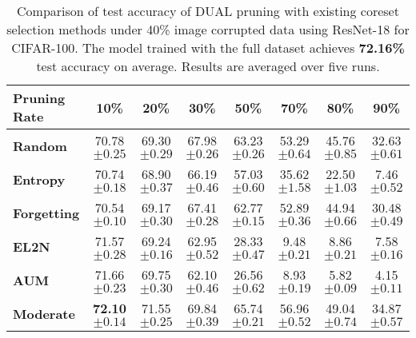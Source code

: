 \begin{table}[ht]
\caption{\label{tab:image_corruption_40_cifar}Comparison of test accuracy of DUAL pruning with existing coreset selection methods under 40\% image corrupted data using ResNet-18 for CIFAR-100. The model trained with the full dataset achieves \textbf{72.16\%} test accuracy on average. Results are averaged over five runs.}
\setlength{\tabcolsep}{3.1pt}
\centering
\begin{tabular}{lccccccc}
    \toprule
    \textbf{Pruning Rate} & \textbf{10\%} & \textbf{20\%} & \textbf{30\%} & \textbf{50\%} & \textbf{70\%} & \textbf{80\%} & \textbf{90\%} \\
    \midrule
    \textbf{Random} & 70.78 \scriptsize{$ \pm 0.25 $} & 69.30 \scriptsize{$ \pm 0.29 $} & 67.98 \scriptsize{$ \pm 0.26 $} & 63.23 \scriptsize{$ \pm 0.26 $} & 53.29 \scriptsize{$ \pm 0.64 $} & 45.76 \scriptsize{$ \pm 0.85 $} & 32.63 \scriptsize{$ \pm 0.61 $} \\
    
    \textbf{Entropy} & 70.74 \scriptsize{$ \pm 0.18 $} & 68.90 \scriptsize{$ \pm 0.37 $} & 66.19 \scriptsize{$ \pm 0.46 $} & 57.03 \scriptsize{$ \pm 0.60 $} & 35.62 \scriptsize{$ \pm 1.58 $} & 22.50 \scriptsize{$ \pm 1.03 $} & 7.46 \scriptsize{$ \pm 0.52 $} \\
    
    \textbf{Forgetting} & 70.54 \scriptsize{$ \pm 0.10 $} & 69.17 \scriptsize{$ \pm 0.30 $} & 67.41 \scriptsize{$ \pm 0.28 $} & 62.77 \scriptsize{$ \pm 0.15 $} & 52.89 \scriptsize{$ \pm 0.36 $} & 44.94 \scriptsize{$ \pm 0.66 $} & 30.48 \scriptsize{$ \pm 0.49 $} \\
    
    \textbf{EL2N} & 71.57 \scriptsize{$ \pm 0.28 $} & 69.24 \scriptsize{$ \pm 0.16 $} & 62.95 \scriptsize{$ \pm 0.52 $} & 28.33 \scriptsize{$ \pm 0.47 $} & 9.48 \scriptsize{$ \pm 0.21 $} & 8.86 \scriptsize{$ \pm 0.21 $} & 7.58 \scriptsize{$ \pm 0.16 $} \\
    
    \textbf{AUM} & 71.66 \scriptsize{$ \pm 0.23 $} & 69.75 \scriptsize{$ \pm 0.30 $} & 62.10 \scriptsize{$ \pm 0.46 $} & 26.56 \scriptsize{$ \pm 0.62 $} & 8.93 \scriptsize{$ \pm 0.19 $} & 5.82 \scriptsize{$ \pm 0.09 $} & 4.15 \scriptsize{$ \pm 0.11 $} \\
    
    \textbf{Moderate} & \textbf{72.10} \scriptsize{$ \pm 0.14 $} & 71.55 \scriptsize{$ \pm 0.25 $} & 69.84 \scriptsize{$ \pm 0.39 $} & 65.74 \scriptsize{$ \pm 0.21 $} & 56.96 \scriptsize{$ \pm 0.52 $} & 49.04 \scriptsize{$ \pm 0.74 $} & 34.87 \scriptsize{$ \pm 0.57 $} \\
    

\end{tabular}
\end{table}
